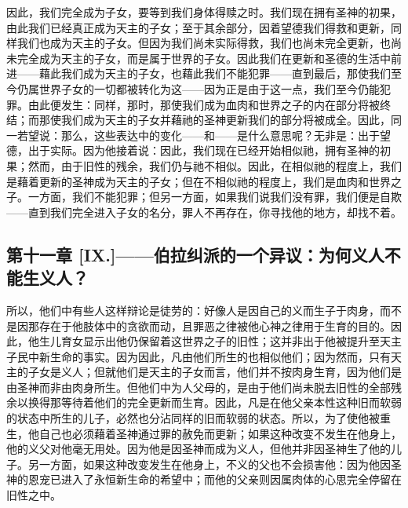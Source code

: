 因此，我们完全成为子女，要等到我们身体得赎之时。我们现在拥有圣神的初果，由此我们已经真正成为天主的子女；至于其余部分，因着望德我们得救和更新，同样我们也成为天主的子女。但因为我们尚未实际得救，我们也尚未完全更新，也尚未完全成为天主的子女，而是属于世界的子女。因此我们在更新和圣德的生活中前进——藉此我们成为天主的子女，也藉此我们不能犯罪——直到最后，那使我们至今仍属世界子女的一切都被转化为这——因为正是由于这一点，我们至今仍能犯罪。由此便发生：同样，那时，那使我们成为血肉和世界之子的内在部分将被终结；而那使我们成为天主的子女并藉祂的圣神更新我们的部分将被成全。因此，同一若望说：那么，这些表达中的变化——和——是什么意思呢？无非是：出于望德，出于实际。因为他接着说：因此，我们现在已经开始相似祂，拥有圣神的初果；然而，由于旧性的残余，我们仍与祂不相似。因此，在相似祂的程度上，我们是藉着更新的圣神成为天主的子女；但在不相似祂的程度上，我们是血肉和世界之子。一方面，我们不能犯罪；但另一方面，如果我们说我们没有罪，我们便是自欺——直到我们完全进入子女的名分，罪人不再存在，你寻找他的地方，却找不着。\par


\subsection{第十一章 [IX.]——伯拉纠派的一个异议：为何义人不能生义人？}

所以，他们中有些人这样辩论是徒劳的：好像人是因自己的义而生子于肉身，而不是因那存在于他肢体中的贪欲而动，且罪恶之律被他心神之律用于生育的目的。因此，他生儿育女显示出他仍保留着这世界之子的旧性；这并非出于他被提升至天主子民中新生命的事实。因为因此，凡由他们所生的也相似他们；因为然而，只有天主的子女是义人；但就他们是天主的子女而言，他们并不按肉身生育，因为他们是由圣神而非由肉身所生。但他们中为人父母的，是由于他们尚未脱去旧性的全部残余以换得那等待着他们的完全更新而生育。因此，凡是在他父亲本性这种旧而软弱的状态中所生的儿子，必然也分沾同样的旧而软弱的状态。所以，为了使他被重生，他自己也必须藉着圣神通过罪的赦免而更新；如果这种改变不发生在他身上，他的义父对他毫无用处。因为他是因圣神而成为义人，但他并非因圣神生了他的儿子。另一方面，如果这种改变发生在他身上，不义的父也不会损害他：因为他因圣神的恩宠已进入了永恒新生命的希望中；而他的父亲则因属肉体的心思完全停留在旧性之中。\par


